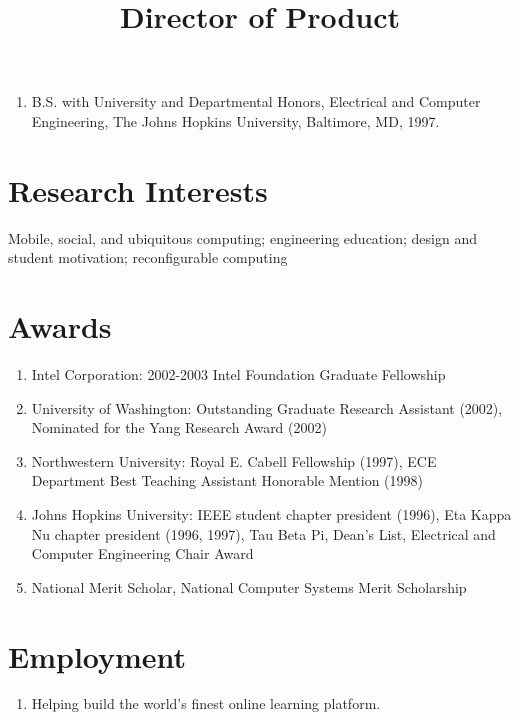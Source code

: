 \documentclass[line]{res}
\begin{document}
\begin{resume}
\begin{enumerate}
		\item B.S. with University and Departmental Honors, Electrical and Computer Engineering, The Johns Hopkins University, Baltimore, MD, 1997.
	\end{enumerate}
	
	\section{\sc Research Interests}
	
	Mobile, social, and ubiquitous computing; engineering education; design and student motivation; reconfigurable computing
	
	\section{\sc Awards}
	\begin{enumerate}
		
		\item Intel Corporation: 2002-2003 Intel Foundation Graduate Fellowship
		
		\item University of Washington: Outstanding Graduate Research Assistant (2002), Nominated for the Yang Research Award (2002)
		
		\item Northwestern University: Royal E. Cabell Fellowship (1997), ECE Department Best Teaching Assistant Honorable Mention (1998)
		
		\item Johns Hopkins University: IEEE student chapter president (1996), Eta Kappa Nu chapter president (1996, 1997), Tau Beta Pi, Dean's List, Electrical and Computer Engineering Chair Award
		
		\item National Merit Scholar, National Computer Systems Merit Scholarship
	\end{enumerate}
	
	\section{\sc Employment}
	\begin{enumerate}

		\item {} 
		\title{Director of Product} 
		 
		\begin{position}
			Helping build the world's finest online learning platform.
		\end{position}


\end{enumerate}
\end{resume}
\end{document}
